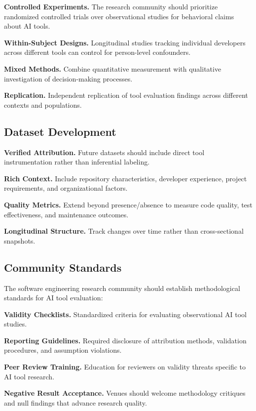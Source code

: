 \documentclass[conference]{IEEEtran}
\begin{document}
\textbf{Controlled Experiments.} The research community should prioritize randomized controlled trials over observational studies for behavioral claims about AI tools.

\textbf{Within-Subject Designs.} Longitudinal studies tracking individual developers across different tools can control for person-level confounders.

\textbf{Mixed Methods.} Combine quantitative measurement with qualitative investigation of decision-making processes.

\textbf{Replication.} Independent replication of tool evaluation findings across different contexts and populations.

\subsection{Dataset Development}

\textbf{Verified Attribution.} Future datasets should include direct tool instrumentation rather than inferential labeling.

\textbf{Rich Context.} Include repository characteristics, developer experience, project requirements, and organizational factors.

\textbf{Quality Metrics.} Extend beyond presence/absence to measure code quality, test effectiveness, and maintenance outcomes.

\textbf{Longitudinal Structure.} Track changes over time rather than cross-sectional snapshots.

\subsection{Community Standards}

The software engineering research community should establish methodological standards for AI tool evaluation:

\textbf{Validity Checklists.} Standardized criteria for evaluating observational AI tool studies.

\textbf{Reporting Guidelines.} Required disclosure of attribution methods, validation procedures, and assumption violations.

\textbf{Peer Review Training.} Education for reviewers on validity threats specific to AI tool research.

\textbf{Negative Result Acceptance.} Venues should welcome methodology critiques and null findings that advance research quality.
\end{document}
